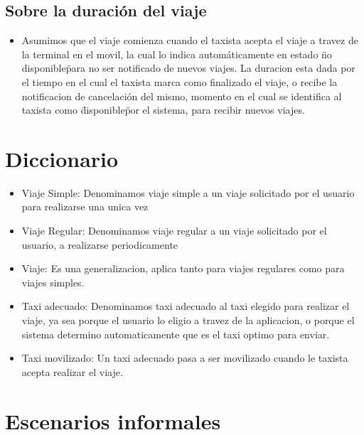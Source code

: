 \documentclass[a4paper]{article}
\begin{document}
\subsection{Sobre la duraci\'on del viaje}
\begin{itemize}
\item Asumimos que el viaje comienza cuando el taxista acepta el viaje a travez de la terminal en el movil, la cual lo indica autom\'aticamente en estado \"no disponible\" para no ser notificado de nuevos viajes. La duracion esta dada por el tiempo en el cual el taxista marca como finalizado el viaje, o recibe la notificacion de cancelaci\'on del mismo, momento en el cual se identifica al taxista como \"disponible\" por el sistema, para recibir nuevos viajes.
\end{itemize}

\section{Diccionario}
\begin{itemize}
\item Viaje Simple: Denominamos viaje simple a un viaje solicitado por el usuario para realizarse una unica vez
\item Viaje Regular: Denominamos viaje regular a un viaje solicitado por el usuario, a realizarse periodicamente
\item Viaje: Es una generalizacion, aplica tanto para viajes regulares como para viajes simples.
\item Taxi adecuado: Denominamos taxi adecuado al taxi elegido para realizar el viaje, ya sea porque el usuario lo eligio a travez de la aplicacion, o porque el sistema determino automaticamente que es el taxi optimo para enviar.
\item Taxi movilizado: Un taxi adecuado pasa a ser movilizado cuando le taxista acepta realizar el viaje.
\end{itemize}

\section{Escenarios informales}
\end{document}
